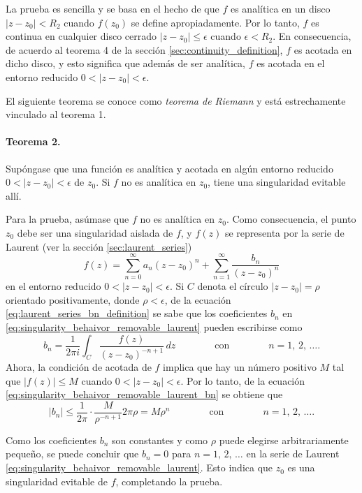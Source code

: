 \documentclass[a4paper]{report}
\begin{document}
La prueba es sencilla y se basa en el hecho de que \(f\) es analítica en un disco \(|z-z_0|<R_2\) cuando \(f(z_0)\) se define apropiadamente. Por lo tanto, \(f\) es continua en cualquier disco cerrado \(|z-z_0|\leq\epsilon\) cuando \(\epsilon<R_2\). En consecuencia, de acuerdo al teorema 4 de la sección \ref{sec:continuity_definition}, \(f\) es acotada en dicho disco, y esto significa que además de ser analítica, \(f\) es acotada en el entorno reducido \(0<|z-z_0|<\epsilon\).

El siguiente teorema se conoce como \emph{teorema de Riemann} y está estrechamente vinculado al teorema 1.

\paragraph{Teorema 2.} Supóngase que una función es analítica y acotada en algún entorno reducido \(0<|z-z_0|<\epsilon\) de \(z_0\). Si \(f\) no es analítica en \(z_0\), tiene una singularidad evitable allí. 

Para la prueba, asúmase que \(f\) no es analítica en \(z_0\). Como consecuencia, el punto \(z_0\) debe ser una singularidad aislada de \(f\), y \(f(z)\) se representa por la serie de Laurent (ver la sección \ref{sec:laurent_series})
\begin{equation}\label{eq:singularity_behaivor_removable_laurent}
 f(z)=\sum_{n=0}^\infty a_n(z-z_0)^n+\sum_{n=1}^\infty\frac{b_n}{(z-z_0)^n} 
\end{equation}
en el entorno reducido \(0<|z-z_0|<\epsilon\). Si \(C\) denota el círculo \(|z-z_0|=\rho\) orientado positivamente, donde \(\rho<\epsilon\), de la ecuación \ref{eq:laurent_series_bn_definition} se sabe que los coeficientes \(b_n\) en \ref{eq:singularity_behaivor_removable_laurent} pueden escribirse como
\begin{equation}\label{eq:singularity_behaivor_removable_laurent_bn}
 b_n=\frac{1}{2\pi i}\int_C\frac{f(z)}{(z-z_0)^{-n+1}}\,dz
 \qquad\qquad\textrm{con}\qquad\qquad
 n=1,\,2,\,\dots. 
\end{equation}
Ahora, la condición de acotada de \(f\) implica que hay un número positivo \(M\) tal que \(|f(z)|\leq M\) cuando \(0<|z-z_0|<\epsilon\). Por lo tanto, de la ecuación \ref{eq:singularity_behaivor_removable_laurent_bn} se obtiene que 
\[
 |b_n|\leq\frac{1}{2\pi}\cdot\frac{M}{\rho^{-n+1}}2\pi\rho=M\rho^n 
 \qquad\qquad\textrm{con}\qquad\qquad
 n=1,\,2,\,\dots. 
\]

Como los coeficientes \(b_n\) son constantes y como \(\rho\) puede elegirse arbitrariamente pequeño, se puede concluir que \(b_n=0\) para \(n=1,\,2,\,\dots\) en la serie de Laurent \ref{eq:singularity_behaivor_removable_laurent}. Esto indica que \(z_0\) es una singularidad evitable de \(f\), completando la prueba.
\end{document}
